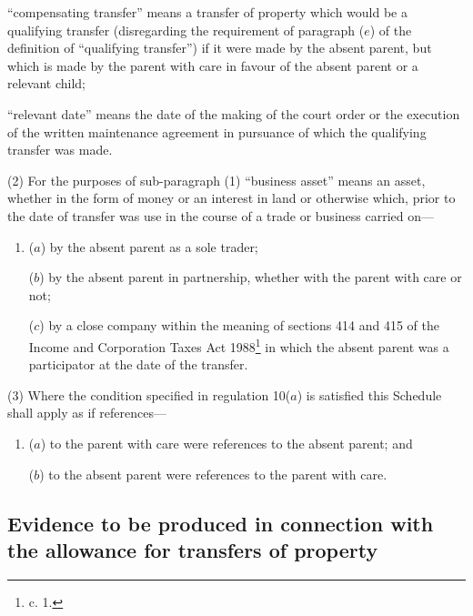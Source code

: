 \documentclass[12pt,a4paper]{article}
\begin{document}
\begin{enumerate}
“compensating transfer” means a transfer of property which would be a qualifying transfer (disregarding the requirement of paragraph ($e$) of the definition of “qualifying transfer”) if it were made by the absent parent, but which is made by the parent with care in favour of the absent parent or a relevant child;

“relevant date” means the date of the making of the court order or the execution of the written maintenance agreement in pursuance of which the qualifying transfer was made.
\end{enumerate}

(2) For the purposes of sub-paragraph (1) “business asset” means an asset, whether in the form of money or an interest in land or otherwise which, prior to the date of transfer was use in the course of a trade or business carried on—
\begin{enumerate}\item[]
($a$) by the absent parent as a sole trader;

($b$) by the absent parent in partnership, whether with the parent with care or not;

($c$) by a close company within the meaning of sections 414 and 415 of the Income and Corporation Taxes Act 1988\footnote{ c. 1.} in which the absent parent was a participator at the date of the transfer.
\end{enumerate}

(3) Where the condition specified in regulation 10($a$) is satisfied this Schedule shall apply as if references—
\begin{enumerate}\item[]
($a$) to the parent with care were references to the absent parent; and

($b$) to the absent parent were references to the parent with care.
\end{enumerate}

\subsection*{\sloppy Evidence to be produced in connection with the allowance for transfers of property}
\end{document}
